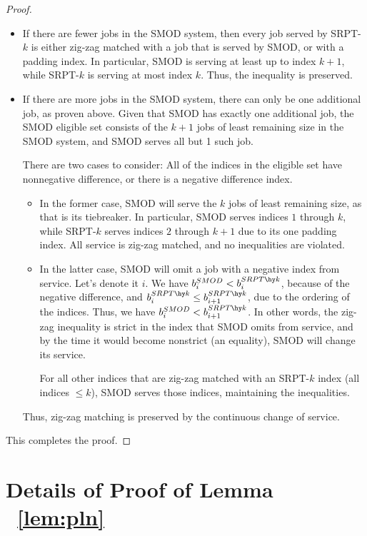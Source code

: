 \documentclass[acmsmall]{acmart}
\begin{document}
\begin{proof}
\begin{itemize}
        \item If there are fewer jobs in the SMOD system, then every job served by SRPT-$k$ is either zig-zag matched with a job that is served by SMOD, or with a padding index. In particular, SMOD is serving at least up to index $k+1$, while SRPT-$k$ is serving at most index $k$. Thus, the inequality is preserved.

        \item If there are more jobs in the SMOD system, there can only be one additional job, as proven above. Given that SMOD has exactly one additional job, the SMOD eligible set consists of the $k+1$ jobs of least remaining size in the SMOD system, and SMOD serves all but 1 such job. 
        
        There are two cases to consider: All of the indices in the eligible set have nonnegative difference, or there is a negative difference index.
        \begin{itemize}
            \item In the former case, SMOD will serve the $k$ jobs of least remaining size, as that is its tiebreaker. In particular, SMOD serves indices $1$ through $k$, while SRPT-$k$ serves indices $2$ through $k+1$ due to its one padding index. All service is zig-zag matched, and no inequalities are violated.

            \item In the latter case, SMOD will omit a job with a negative index from service. Let's denote it $i$.  We have $b^{SMOD}_i < b^{SRPT\hy k}_i$, because of the negative difference, and $b^{SRPT\hy k}_i \le b^{SRPT\hy k}_{i+1}$, due to the ordering of the indices. Thus, we have $b^{SMOD}_i < b^{SRPT\hy k}_{i+1}$. In other words, the zig-zag inequality is strict in the index that SMOD omits from service, and by the time it would become nonstrict (an equality), SMOD will change its service.

            For all other indices that are zig-zag matched with an SRPT-$k$ index (all indices $\le k$), SMOD serves those indices, maintaining the inequalities.
        \end{itemize}
    Thus, zig-zag matching is preserved by the continuous change of service.
    \end{itemize}

This completes the proof.
\end{proof}


\section[Details of Proof of Lemma ~\ref{lem:pln}]{Details of Proof of Lemma ~\ref{lem:pln}}
\label{ap:proof-pln}
\end{document}
